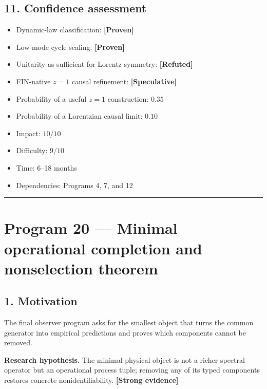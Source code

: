 \documentclass[11pt,a4paper,openany]{report}
\newcommand{\statusProven}{\textcolor{fingreen}{[Proven]}}
\newcommand{\statusStrong}{\textcolor{finblue}{[Strong evidence]}}
\newcommand{\statusSpeculative}{\textcolor{finorange}{[Speculative]}}
\newcommand{\statusRefuted}{\textcolor{finred}{[Refuted]}}
\begin{document}
\section{11. Confidence assessment}

\begin{itemize}
\item 
Dynamic-law classification: \textbf{\statusProven{}}

\item 
Low-mode cycle scaling: \textbf{\statusProven{}}

\item 
Unitarity as sufficient for Lorentz symmetry: \textbf{\statusRefuted{}}

\item 
FIN-native \(z=1\) causal refinement: \textbf{\statusSpeculative{}}

\item 
Probability of a useful \(z=1\) construction: \(0.35\)

\item 
Probability of a Lorentzian causal limit: \(0.10\)

\item 
Impact: \(10/10\)

\item 
Difficulty: \(9/10\)

\item 
Time: 6–18 months

\item 
Dependencies: Programs 4, 7, and 12

\end{itemize}

\par\medskip\hrule\medskip

\chapter{Program 20 — Minimal operational completion and nonselection theorem}

\section{1. Motivation}

The final observer program asks for the smallest object that turns the common generator into empirical predictions and proves which components cannot be removed.

\textbf{Research hypothesis.} The minimal physical object is not a richer spectral operator but an operational process tuple; removing any of its typed components restores concrete nonidentifiability. \textbf{\statusStrong{}}
\end{document}
